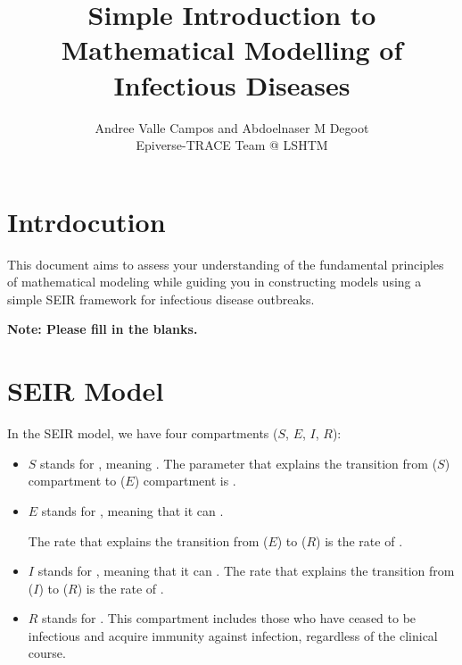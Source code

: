 \documentclass{article}
\author{Andree Valle Campos and Abdoelnaser M Degoot \\ Epiverse-TRACE Team @ LSHTM }
\title{Simple Introduction to Mathematical Modelling of Infectious Diseases}
\begin{document}
\maketitle

\section{Intrdocution}
This document aims to assess  your understanding of the fundamental 
principles of mathematical modeling while guiding you in constructing models using 
a simple SEIR framework for infectious disease outbreaks. 
 
 \textbf{Note: Please fill in the blanks.}

\section{SEIR Model}

 In the  SEIR model, we have four compartments (\( S \), \( E \), \( I \), \( R \)):

\begin{itemize}
    \item \( S \) stands for \underline{\hspace{2cm}}, meaning \underline{\hspace{3cm}}.
The parameter that explains the transition from  (\( S \)) compartment 
to  (\( E \)) compartment is \underline{\hspace{6cm}}.
\item \(E\) stands for \underline{\hspace{2cm}}, meaning that it can 
    \underline{\hspace{3cm}}. 
    
    The rate that explains the transition from  (\( E \)) to  (\( R \)) is the rate of \underline{\hspace{6cm}}.
    
    \item \( I \) stands for \underline{\hspace{2cm}}, meaning that it can 
    \underline{\hspace{3cm}}.
    The rate that explains the transition from  (\( I \)) to  (\( R \)) is the rate of \underline{\hspace{6cm}}.
    
    \item \( R \) stands for \underline{\hspace{3cm}}. This compartment includes those who have ceased to be infectious and acquire immunity against infection, regardless of the clinical course.
\end{itemize}
\end{document}
